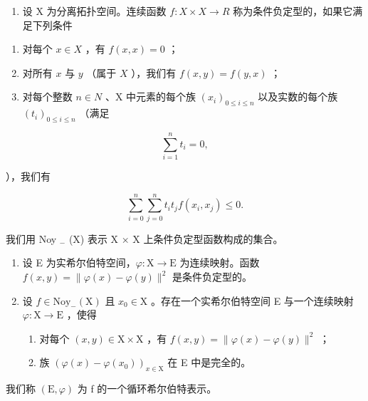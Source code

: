 \begin{enumerate}
\def\labelenumi{\arabic{enumi})}
\setcounter{enumi}{4}
\tightlist
\item
  设 X 为分离拓扑空间。连续函数 \(f: X \times X \to R\) 称为条件负定型的，如果它满足下列条件
\end{enumerate}

\begin{enumerate}
\def\labelenumi{(\roman{enumi})}
\item
  对每个 \(x \in X\) ，有 \(f(x, x) = 0\) ；
\item
  对所有 \(x\) 与 \(y\) （属于 \(X\) ），我们有 \(f(x,y) = f(y,x)\) ；
\item
  对每个整数 \(n \in N\) 、X 中元素的每个族 \((x_{i})_{0 \leqslant i \leqslant n}\) 以及实数的每个族 \((t_{i})_{0 \leqslant i \leqslant n}\) （满足
\end{enumerate}

\[
\sum_ {i = 1} ^ {n} t _ {i} = 0,
\]

），我们有

\[
\sum_ {i = 0} ^ {n} \sum_ {j = 0} ^ {n} t _ {i} t _ {j} f (x _ {i}, x _ {j}) \leqslant 0.
\]

我们用 Noy \(_{-}\) (X) 表示 X × X 上条件负定型函数构成的集合。

\begin{enumerate}
\def\labelenumi{\alph{enumi})}
\item
  设 E 为实希尔伯特空间，\(\varphi\colon\mathrm{X}\to\mathrm{E}\) 为连续映射。函数 \(f(x,y)=\|\varphi(x)-\varphi(y)\|^{2}\) 是条件负定型的。
\item
  设 \(f\in\mathrm{Noy}_{-}(\mathrm{X})\) 且 \(x_{0}\in\mathrm{X}\) 。存在一个实希尔伯特空间 E 与一个连续映射 \(\varphi\colon\mathrm{X}\to\mathrm{E}\) ，使得
  \begin{enumerate}
  \def\labelenumii{\alph{enumii})}
  \tightlist
  \item
    对每个 \((x,y)\in \mathrm{X}\times \mathrm{X}\) ，有 \(f(x,y) = \| \varphi (x) - \varphi (y)\| ^2\) ；
  \item
    族 \((\varphi(x)-\varphi(x_{0}))_{x\in\mathrm{X}}\) 在 E 中是完全的。
  \end{enumerate}
\end{enumerate}

我们称 \((\mathrm{E},\varphi)\) 为 f 的一个循环希尔伯特表示。

